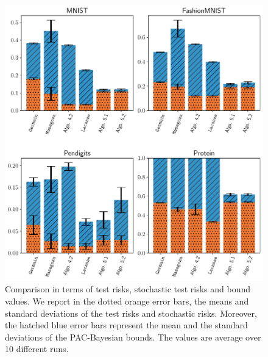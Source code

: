 \begin{figure}
    \centering
    \includegraphics[width=1.0\linewidth]{chapter_5/figures/tree_multi_1.pdf}
    \caption[Comparison of the Risks and the Bound Values (3/4)]{
    Comparison in terms of test risks, stochastic test risks and bound values. 
    We report in the dotted orange error bars, the means and standard deviations of the test risks and stochastic risks.
    Moreover, the hatched blue error bars represent the mean and the standard deviations of the PAC-Bayesian bounds.
    The values are average over 10 different runs.
    }
    \label{chap:mv-sto:fig:stump-multi-1}
\end{figure}

